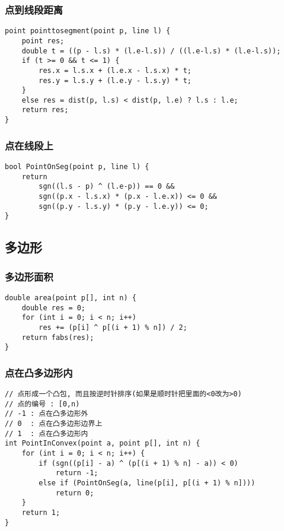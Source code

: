 \documentclass[a4paper]{article}
\begin{document}
\subsubsection{点到线段距离}
\begin{lstlisting}
point pointtosegment(point p, line l) {
	point res;
	double t = ((p - l.s) * (l.e-l.s)) / ((l.e-l.s) * (l.e-l.s));
	if (t >= 0 && t <= 1) {
		res.x = l.s.x + (l.e.x - l.s.x) * t;
		res.y = l.s.y + (l.e.y - l.s.y) * t;
	}
	else res = dist(p, l.s) < dist(p, l.e) ? l.s : l.e;
	return res;
}
\end{lstlisting}
\subsubsection{点在线段上}
\begin{lstlisting}
bool PointOnSeg(point p, line l) {
	return
	    sgn((l.s - p) ^ (l.e-p)) == 0 &&
	    sgn((p.x - l.s.x) * (p.x - l.e.x)) <= 0 &&
	    sgn((p.y - l.s.y) * (p.y - l.e.y)) <= 0;
}
\end{lstlisting}
\subsection{多边形}
\subsubsection{多边形面积}
\begin{lstlisting}
double area(point p[], int n) {
    double res = 0;
    for (int i = 0; i < n; i++)
        res += (p[i] ^ p[(i + 1) % n]) / 2;
    return fabs(res);
}
\end{lstlisting}
\subsubsection{点在凸多边形内}
\begin{lstlisting}
// 点形成一个凸包, 而且按逆时针排序(如果是顺时针把里面的<0改为>0)
// 点的编号 : [0,n)
// -1 : 点在凸多边形外
// 0  : 点在凸多边形边界上
// 1  : 点在凸多边形内
int PointInConvex(point a, point p[], int n) {
	for (int i = 0; i < n; i++) {
		if (sgn((p[i] - a) ^ (p[(i + 1) % n] - a)) < 0)
			return -1;
		else if (PointOnSeg(a, line(p[i], p[(i + 1) % n])))
			return 0;
	}
	return 1;
}
\end{lstlisting}
\end{document}
